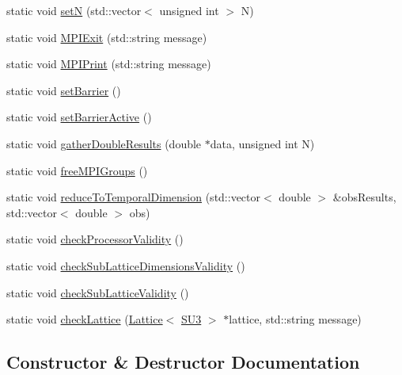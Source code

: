 \begin{DoxyCompactItemize}
static void \mbox{\hyperlink{class_parallel_1_1_communicator_aea1c6e1ff8f4f40d3db0ac8e0b29db62}{setN}} (std\+::vector$<$ unsigned int $>$ N)
\item 
static void \mbox{\hyperlink{class_parallel_1_1_communicator_a6759125172843d9229c644f2a3a21ab7}{M\+P\+I\+Exit}} (std\+::string message)
\item 
static void \mbox{\hyperlink{class_parallel_1_1_communicator_ab1b15401de819cf343398b767d6730ed}{M\+P\+I\+Print}} (std\+::string message)
\item 
static void \mbox{\hyperlink{class_parallel_1_1_communicator_ad48e48ab0137dab329d31fc1e3ebf179}{set\+Barrier}} ()
\item 
static void \mbox{\hyperlink{class_parallel_1_1_communicator_a13263be32405fa088f06b07f7fdfe281}{set\+Barrier\+Active}} ()
\item 
static void \mbox{\hyperlink{class_parallel_1_1_communicator_a6c60f0fbbe23ef0bf342b0157d080007}{gather\+Double\+Results}} (double $\ast$data, unsigned int N)
\item 
static void \mbox{\hyperlink{class_parallel_1_1_communicator_adc5e4acb372e9db19276572007940832}{free\+M\+P\+I\+Groups}} ()
\item 
static void \mbox{\hyperlink{class_parallel_1_1_communicator_a3da13427d693e0ce924159e871c83e19}{reduce\+To\+Temporal\+Dimension}} (std\+::vector$<$ double $>$ \&obs\+Results, std\+::vector$<$ double $>$ obs)
\item 
static void \mbox{\hyperlink{class_parallel_1_1_communicator_af507f05e369586d3ffea12d366e972ef}{check\+Processor\+Validity}} ()
\item 
static void \mbox{\hyperlink{class_parallel_1_1_communicator_a5b2b11a63237238ac6b6552e5a7312d0}{check\+Sub\+Lattice\+Dimensions\+Validity}} ()
\item 
static void \mbox{\hyperlink{class_parallel_1_1_communicator_a003d94aceebf2fddc6b4ceff584ac8d7}{check\+Sub\+Lattice\+Validity}} ()
\item 
static void \mbox{\hyperlink{class_parallel_1_1_communicator_a0975f377dbde235d418ca7054001f3a3}{check\+Lattice}} (\mbox{\hyperlink{class_lattice}{Lattice}}$<$ \mbox{\hyperlink{class_s_u3}{S\+U3}} $>$ $\ast$lattice, std\+::string message)
\end{DoxyCompactItemize}


\subsection{Constructor \& Destructor Documentation}
\mbox{\label{class_parallel_1_1_communicator_ae4242fefd3f34197fab482141ce08550}} 
